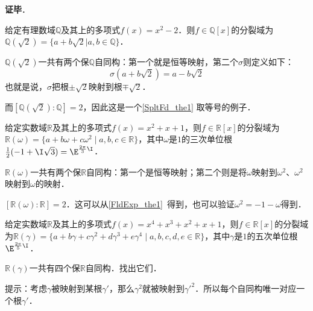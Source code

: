 









\textbf{证毕}．





\begin{example}{}

给定有理数域$\mathbb{Q}$及其上的多项式$f(x)=x^2-2$．则$f\in\mathbb{Q}[x]$的分裂域为$\mathbb{Q}(\sqrt{2})=\{a+b\sqrt{2}|a, b\in\mathbb{Q}\}$．

$\mathbb{Q}(\sqrt{2})$一共有两个保$\mathbb{Q}$自同构：第一个就是恒等映射，第二个$\sigma$则定义如下：
\begin{equation}
\sigma(a+b\sqrt{2})=a-b\sqrt{2}
\end{equation}
也就是说，$\sigma$把根$\pm\sqrt{2}$映射到根$\mp\sqrt{2}$．


而$[\mathbb{Q}(\sqrt{2}):\mathbb{Q}]=2$，因此这是一个\autoref{SpltFd_the1} 取等号的例子．

\end{example}


\begin{example}{}
给定实数域$\mathbb{R}$及其上的多项式$f(x)=x^2+x+1$，则$f\in\mathbb{R}[x]$的分裂域为$\mathbb{R}(\omega)=\{a+b\omega+c\omega^2 \mid a, b, c\in\mathbb{R}\}$，其中$\omega$是$1$的三次单位根$\frac{1}{2}(-1+\I\sqrt{3})=\E^{\frac{2\pi}{3}\I}$．

$\mathbb{R}(\omega)$一共有两个保$\mathbb{R}$自同构：第一个是恒等映射；第二个则是将$\omega$映射到$\omega^2$、$\omega^2$映射到$\omega$的映射．

$[\mathbb{R}(\omega):\mathbb{R}]=2$．这可以从\autoref{FldExp_the1}~得到，也可以验证$\omega^2=-1-\omega$得到．
\end{example}



\begin{exercise}{}
给定实数域$\mathbb{R}$及其上的多项式$f(x)=x^4+x^3+x^2+x+1$，则$f\in\mathbb{R}[x]$的分裂域为$\mathbb{R}(\gamma)=\{a+b\gamma+c\gamma^2+d\gamma^3+e\gamma^4 \mid a, b, c, d, e\in\mathbb{R}\}$，其中$\gamma$是$1$的五次单位根$\E^{\frac{2\pi}{5}\I}$．

$\mathbb{R}(\gamma)$一共有四个保$\mathbb{R}$自同构．找出它们．

提示：考虑$\gamma$被映射到某根$\gamma'$，那么$\gamma^2$就被映射到$\gamma'^2$．所以每个自同构唯一对应一个根$\gamma'$．
\end{exercise}



